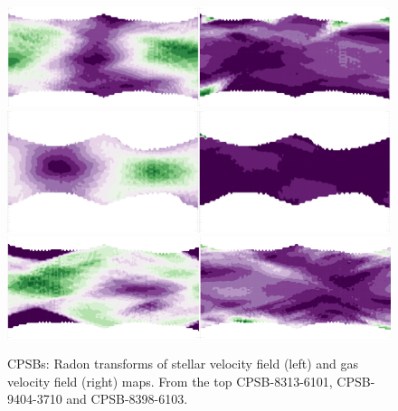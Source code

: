 
\begin{figure}
    \centering
    \includegraphics[width=0.8\columnwidth]{images/RadonPlots/RT-snips/CPSB-8313-6101-RT-snip.png}
    \includegraphics[width=0.8\columnwidth]{images/RadonPlots/RT-snips/CPSB-9494-3701-RT-snip.png}
    \includegraphics[width=0.8\columnwidth]{images/RadonPlots/RT-snips/CPSB-8398-6102-RT-snip.png}
    \caption{CPSBs: Radon transforms of stellar velocity field (left) and gas velocity field (right) maps. From the top CPSB-8313-6101, CPSB-9404-3710 and CPSB-8398-6103.}
    \label{fig:CPSB-RTs}
\end{figure}

